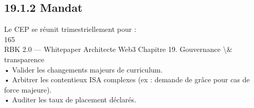 \subsection{19.1.2 Mandat}
Le CEP se réunit trimestriellement pour :\\
\vspace{0.5em}
\vspace{0.5em}
165\\
RBK 2.0 — Whitepaper Architecte Web3                                                             Chapitre 19. Gouvernance \textbackslash{}& transparence\\
\vspace{0.5em}
\vspace{0.5em}
• Valider les changements majeurs de curriculum.\\
\vspace{0.5em}
• Arbitrer les contentieux ISA complexes (ex : demande de grâce pour cas de force majeure).\\
\vspace{0.5em}
• Auditer les taux de placement déclarés.\\
\vspace{0.5em}
\vspace{0.5em}
